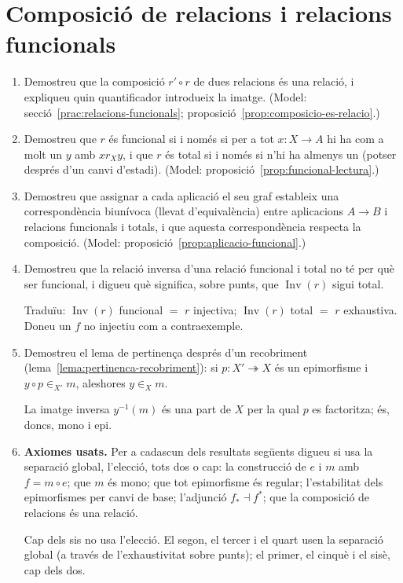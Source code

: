 \section{Composició de relacions i relacions funcionals}

\begin{enumerate}[resume]
  \item Demostreu que la composició \(r'\circ r\) de dues relacions és una relació, i expliqueu quin quantificador introdueix la imatge. (Model: secció~\ref{prac:relacions-funcionals}; proposició~\ref{prop:composicio-es-relacio}.)

  \item Demostreu que \(r\) és funcional si i només si per a tot \(x\colon X\to A\) hi ha com a molt un \(y\) amb \(x\mathrel{r_X}y\), i que \(r\) és total si i només si n'hi ha almenys un (potser després d'un canvi d'estadi). (Model: proposició~\ref{prop:funcional-lectura}.)

  \item Demostreu que assignar a cada aplicació el seu graf estableix una correspondència biunívoca (llevat d'equivalència) entre aplicacions \(A\to B\) i relacions funcionals i totals, i que aquesta correspondència respecta la composició. (Model: proposició~\ref{prop:aplicacio-funcional}.)

  \item Demostreu que la relació inversa d'una relació funcional i total no té per què ser funcional, i digueu què significa, sobre punts, que \(\operatorname{Inv}(r)\) sigui total. \begin{indicacio}Traduïu: \(\operatorname{Inv}(r)\) funcional \(=\) \(r\) injectiva; \(\operatorname{Inv}(r)\) total \(=\) \(r\) exhaustiva. Doneu un \(f\) no injectiu com a contraexemple.\end{indicacio}

  \item Demostreu el lema de pertinença després d'un recobriment (lema~\ref{lema:pertinenca-recobriment}): si \(p\colon X'\twoheadrightarrow X\) és un epimorfisme i \(y\circ p\in_{X'}m\), aleshores \(y\in_Xm\). \begin{indicacio}La imatge inversa \(y^{-1}(m)\) és una part de \(X\) per la qual \(p\) es factoritza; és, doncs, mono i epi.\end{indicacio}

  \item \textbf{Axiomes usats.} Per a cadascun dels resultats següents digueu si usa la separació global, l'elecció, tots dos o cap: la construcció de \(e\) i \(m\) amb \(f=m\circ e\); que \(m\) és mono; que tot epimorfisme és regular; l'estabilitat dels epimorfismes per canvi de base; l'adjunció \(f_*\dashv f^*\); que la composició de relacions és una relació. \begin{indicacio}Cap dels sis no usa l'elecció. El segon, el tercer i el quart usen la separació global (a través de l'exhaustivitat sobre punts); el primer, el cinquè i el sisè, cap dels dos.\end{indicacio}
\end{enumerate}
